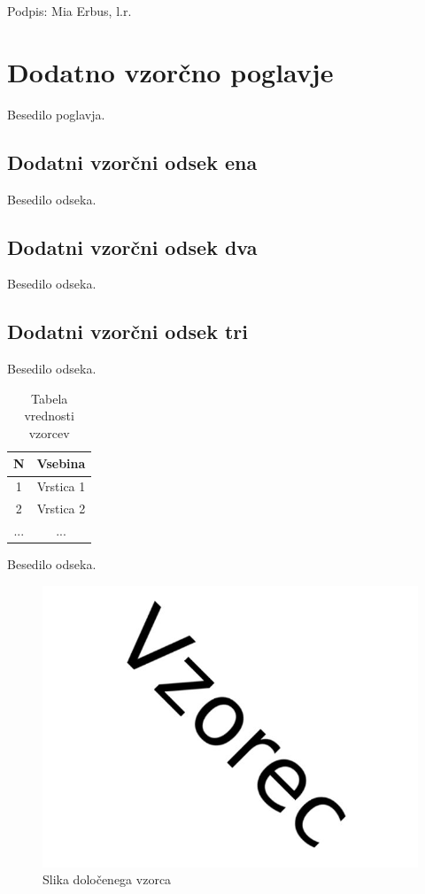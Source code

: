 \documentclass[a4paper,12pt]{report}
\newcommand{\tretjiavtor}{Mia Erbus}
\begin{document}
Podpis: {\tretjiavtor}, l.r.

\chapter{Dodatno vzorčno poglavje}

Besedilo poglavja.

\section{Dodatni vzorčni odsek ena}

Besedilo odseka.

\section{Dodatni vzorčni odsek dva}

Besedilo odseka.

\section{Dodatni vzorčni odsek tri}

Besedilo odseka.

\begin{table}[htb]
 \centering
 \begin{tabular}{c || c}
  \textbf{N} & Vsebina\\ \hline\hline
  1 & Vrstica 1\\        \hline
  2 & Vrstica 2\\        \hline
  ... & ... \\
\end{tabular}
\caption{Tabela vrednosti vzorcev}
\label{tab:1}
\end{table}

Besedilo odseka.

\begin{figure}[htb]
	\centering
	\includegraphics[width=13cm]{img/vzorec.jpg}
	\caption{Slika določenega vzorca}
\label{fig:1}
\end{figure}
\end{document}
